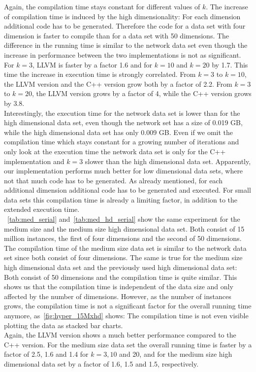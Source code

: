 Again, the compilation time stays constant for different values of $k$. The increase of compilation time is induced by the high dimensionality: For each dimension additional code has to be generated. Therefore the code for a data set with four dimension is faster to compile than for a data set with 50 dimensions. 
The difference in the running time is similar to the network data set even though the increase in performance between the two implementations is not as significant. For $k = 3$, LLVM is faster by a factor 1.6 and for $k = 10$ and $k = 20$ by 1.7. This time the increase in execution time is strongly correlated. From $k = 3$ to $k = 10$, the LLVM version and the C++ version grow both by a factor of 2.2. From $k = 3$ to $k = 20$, the LLVM version grows by a factor of 4, while the C++ version grows by 3.8.
\\
Interestingly, the execution time for the network data set is lower than for the high dimensional data set, even though the network set has a size of 0.019 GB, while the high dimensional data set has only 0.009 GB. Even if we omit the compilation time which stays constant for a growing number of iterations and only look at the execution time the network data set is only for the C++ implementation and $k = 3$ slower than the high dimensional data set. Apparently, our implementation performs much better for low dimensional data sets, where not that much code has to be generated. As already mentioned, for each additional dimension additional code has to be generated and executed. For small data sets this compilation time is already a limiting factor, in addition to the extended execution time.
\\
~\autoref{tab:med_serial} and~\autoref{tab:med_hd_serial} show the same experiment for the medium size and the medium size high dimensional data set. Both consist of 15 million instances, the first of four dimensions and the second of 50 dimensions. The compilation time of the medium size data set is similar to the network data set since both consist of four dimensions. The same is true for the medium size high dimensional data set and the previously used high dimensional data set: Both consist of 50 dimensions and the compilation time is quite similar. This shows us that the compilation time is independent of the data size and only affected by the number of dimensions. However, as the number of instances grows, the compilation time is not a significant factor for the overall running time anymore, as~\autoref{fig:hyper_15Mxhd} shows: The compilation time is not even visible plotting the data as stacked bar charts. 
\\
Again, the LLVM version shows a much better performance compared to the C++ version. For the medium size data set the overall running time is faster by a factor of 2.5, 1.6 and 1.4 for $k = 3, 10$ and 20, and for the medium size high dimensional data set by a factor of 1.6, 1.5 and 1.5, respectively.

